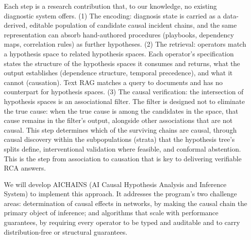 \documentclass[12pt]{article}
\begin{document}
Each step is a research contribution that, to our knowledge, no existing diagnostic system offers. (1) The encoding: diagnosis state is carried as a data-derived, editable population of candidate causal incident chains, and the same representation can absorb hand-authored procedures (playbooks, dependency maps, correlation rules) as further hypotheses. (2) The retrieval: operators match a hypothesis space to related hypothesis spaces. Each operator's specification states the structure of the hypothesis spaces it consumes and returns, what the output establishes (dependence structure, temporal precedence), and what it cannot (causation). Text RAG matches a query to documents and has no counterpart for hypothesis spaces. (3) The causal verification: the intersection of hypothesis spaces is an associational filter. The filter is designed not to eliminate the true cause: when the true cause is among the candidates in the space, that cause remains in the filter's output, alongside other associations that are not causal. This step determines which of the surviving chains are causal, through causal discovery within the subpopulations (strata) that the hypothesis tree's splits define, interventional validation where feasible, and conformal abstention. This is the step from association to causation that is key to delivering verifiable RCA answers.

We will develop AICHAINS (AI Causal Hypothesis Analysis and Inference System) to implement this approach. It addresses the program's two challenge areas: determination of causal effects in networks, by making the causal chain the primary object of inference; and algorithms that scale with performance guarantees, by requiring every operator to be typed and auditable and to carry distribution-free or structural guarantees.
\end{document}
